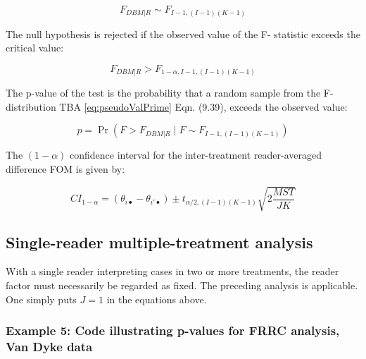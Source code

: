 \documentclass[
]{book}
\begin{document}
\begin{equation}
F_{DBM|R} \sim F_{I-1,(I-1)(K-1)}
\label{eq:SamplingFStatFRRC}
\end{equation}

The null hypothesis is rejected if the observed value of the F- statistic exceeds the critical value:

\begin{equation}
F_{DBM|R} > F_{1-\alpha,I-1,(I-1)(K-1)}
\label{eq:NhRejectRuleFRRC}
\end{equation}

The p-value of the test is the probability that a random sample from the F-distribution TBA \eqref{eq:pseudoValPrime} Eqn. (9.39), exceeds the observed value:

\begin{equation}
p=\Pr\left ( F> F_{DBM|R} \mid F \sim F_{I-1,(I-1)(K-1)} \right )
\label{eq:pFRRC}
\end{equation}

The \((1-\alpha)\) confidence interval for the inter-treatment reader-averaged difference FOM is given by:

\begin{equation}
CI_{1-\alpha}=\left ( \theta_{i \bullet} - \theta_{i' \bullet} \right ) \pm t_{\alpha/2,(I-1)(K-1)}\sqrt{2\frac{MST}{JK}}
\label{eq:confIntervalFRRC}
\end{equation}

\hypertarget{FRRCSingleReaderDBMAnalysis}{%
\subsection{Single-reader multiple-treatment analysis}\label{FRRCSingleReaderDBMAnalysis}}

With a single reader interpreting cases in two or more treatments, the reader factor must necessarily be regarded as fixed. The preceding analysis is applicable. One simply puts \(J = 1\) in the equations above.

\hypertarget{example-5-code-illustrating-p-values-for-frrc-analysis-van-dyke-data}{%
\subsubsection{Example 5: Code illustrating p-values for FRRC analysis, Van Dyke data}\label{example-5-code-illustrating-p-values-for-frrc-analysis-van-dyke-data}}
\end{document}
